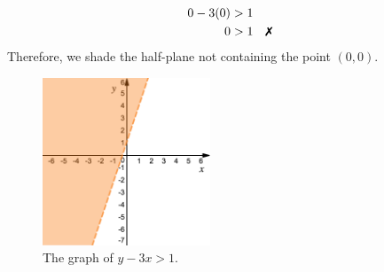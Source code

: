 \begin{align*}
	0-3(0) &> 1 \\
	0 &> 1 \quad \xmark
\end{align*}
Therefore, we shade the half-plane not containing the point $(0,0)$.
%
\begin{figure}[H]
 \includegraphics[width=5cm]{pics/pic2.png}
 \centering
  \caption{The graph of $y-3x> 1$.}
\end{figure}
